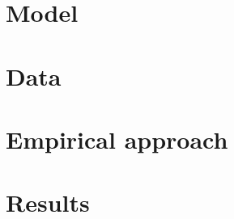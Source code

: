 \documentclass[11pt]{article}
\begin{document}
\section{Model}


\section{Data}


\section{Empirical approach}


\section{Results}


\appendix
\setcounter{table}{0}
\renewcommand{\thetable}{A\arabic{table}}
\renewcommand{\theHtable}{appendix.\thetable}
\setcounter{figure}{0}
\renewcommand{\thefigure}{A\arabic{figure}}
\renewcommand{\theHfigure}{appendix.\thefigure}
\clearpage



\end{document}
